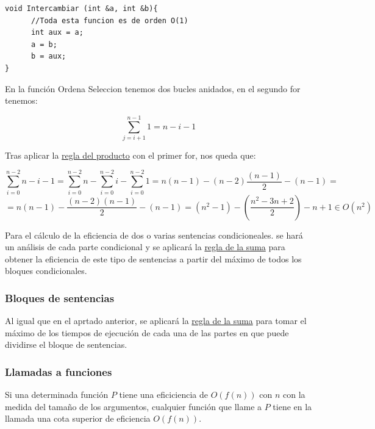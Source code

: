 \documentclass[10pt,a4paper,spanish]{report}
\theoremstyle{definition}
\theoremstyle{remark}
\begin{document}
\begin{description}
\begin{verbatim}
void Intercambiar (int &a, int &b){
      //Toda esta funcion es de orden O(1)
      int aux = a;
      a = b;
      b = aux;
}
\end{verbatim}

    En la función Ordena Seleccion tenemos dos bucles anidados, en el segundo for tenemos:

\begin{displaymath}
\sum_{j=i+1}^{n-1} 1 = n - i -1
\end{displaymath}

    Tras aplicar la \hyperref[reglas_efic]{regla del producto} con el primer for, nos queda que:

\begin{displaymath}
\sum_{i=0}^{n-2} n - i - 1 = \sum_{i=0}^{n-2} n - \sum_{i=0}^{n-2} i - \sum_{i=0}^{n-2} 1 = n(n-1) - (n-2)\frac{(n-1)}{2} - (n-1) =
\end{displaymath}
\begin{displaymath}
= n(n-1) - \frac{(n-2)(n-1)}{2} - (n-1) = (n^{2}-1) - (\frac{n^{2}-3n+2}{2}) - n + 1 \in O(n^{2})
\end{displaymath}
    
    \end{description}

    Para el cálculo de la eficiencia de dos o varias sentencias condicioneales. se hará un análisis de cada parte condicional y se aplicará la \hyperref[reglas_efic]{regla de la suma} para obtener la eficiencia de este tipo de sentencias a partir del máximo de todos los bloques condicionales.

    \subsubsection{\textcolor{YellowOrange}Bloques de sentencias}

    Al igual que en el aprtado anterior, se aplicará la \hyperref[reglas_efic]{regla de la suma} para tomar el máximo de los tiempos de ejecución de cada una de las partes en que puede dividirse el bloque de sentencias.

    \subsubsection{\textcolor{YellowOrange}Llamadas a funciones}

    Si una determinada función $P$ tiene una eficiciencia de $O(f(n))$ con $n$ con la medida del tamaño de los argumentos, cualquier función que llame a $P$ tiene en la llamada una cota superior de eficiencia $O(f(n))$.
\end{document}
